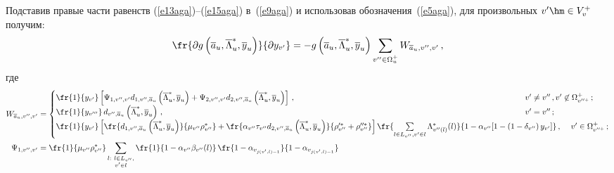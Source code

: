    Подставив правые части равенств (\ref{e13aga})--(\ref{e15aga}) 
в~(\ref{e9aga}) и использовав обозначения~(\ref{e5aga}), для произвольных 
$v^\prime\hm\in V_v^+$ получим:
   \begin{equation}
   \fr{\partial g \left(\overline{a}_u, \overline{\Lambda}_u^*, 
\overline{y}_u\right)}{\partial y_{v^\prime}} =-g\left(\overline{a}_u, 
\overline{\Lambda}_u^*, \overline{y}_u\right)\sum\limits_{v^{\prime\prime} \in \Omega_u^+} W_{\overline{a}_u, 
v^{\prime\prime},v^\prime}\,,
   \label{e16aga}
   \end{equation}
где 
\begin{align*}
W_{\overline{a}_u, v^{\prime\prime}, v^\prime}&=
\begin{cases}
\fr{1}{y_{v^\prime}} \left[ \Psi_{1, v^{\prime\prime}, v^\prime} d_{1, 
v^{\prime\prime}, \overline{a}_u}\left(\overline{\Lambda}_u^*, \overline{y}_u\right) 
+\Psi_{2, v^{\prime\prime}, v^\prime} d_{2, v^{\prime\prime}, \overline{a}_u}
\left(\overline{\Lambda}_u^*, \overline{y}_u\right) \right]\,,\ &\hspace*{-20mm} 
v^\prime \not= v^{\prime\prime}\,, v^\prime\not\in\Omega^+_{v^{\prime\prime +}}\,;\\
\fr{1}{y_{v^{\prime\prime\prime}}}\, d_{v^{\prime\prime}, \overline{a}_u} 
\left(\overline{\Lambda}_u^*, \overline{y}_u\right)\,,\ & \hspace*{-20mm}v^\prime=v^{\prime\prime}\,;\\
\fr{1}{y_{v^\prime}}\left[ 
\fr{d_{1, v^{\prime\prime}, \overline{a}_u}\left(\overline{\Lambda}^*_u, 
\overline{y}_u\right)}{\mu_{ v^{\prime\prime}} \rho_{ v^{\prime\prime}}^*}+
\fr{\alpha_{ v^{\prime\prime}}\tau_{ v^{\prime\prime}} d_{2, v^{\prime\prime}, 
\overline{a}_u}\left(\overline{\Lambda}_u^*, \overline{y}_u\right)}
{\rho_{ v^{\prime\prime}}^{\prime *}+\rho_{ v^{\prime\prime}}^{\prime\prime 
*}}\right] \fr{\sum\limits_{l\in L_{ v^{\prime\prime}}, v^\prime \in l} 
\Lambda^*_{v^{\prime\prime}(l)}(l)}{1-\alpha_{ v^{\prime\prime}}[1-\left(1-
\delta_{ v^{\prime\prime}}\right)y_{v^\prime}]}\,,\ & v^\prime\in\Omega^+_{v^{\prime\prime +}}\,;
\end{cases}
\\
   \Psi_{1, v^{\prime\prime}, v^\prime} &=\fr{1}{\mu_{ v^{\prime\prime}} 
\rho^*_{ v^{\prime\prime}}}  %
\sum\limits_{\substack{{l:\ l\in L_{ v^{\prime\prime}},}\\ {v^\prime\in l}}} \fr{1}{1-\alpha_{ v^{\prime\prime}}\beta_{ 
v^{\prime\prime}}(l)}\,
   \fr{1-\alpha_{v_{j(v^\prime,l)-1}}}{1-\alpha_{ v_{j(v^\prime,l)-1}}
}
\end{align*}
